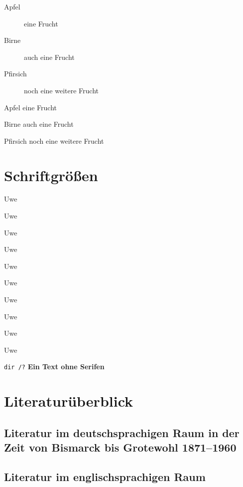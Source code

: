 \documentclass[ngerman,12pt,parskip=half]{scrreprt}
\begin{document}
\begin{description}
\item[Apfel] eine Frucht
\item[Birne] auch eine Frucht
\item[Pfirsich] noch eine weitere Frucht
\end{description}

\begin{compactdesc}
\item[Apfel] eine Frucht
\item[Birne] auch eine Frucht
\item[Pfirsich] noch eine weitere Frucht
\end{compactdesc}

\section{Schriftgrößen}

{\tiny Uwe}

{\scriptsize Uwe} 

{\footnotesize Uwe} 

{\small Uwe} 

{\normalsize Uwe} 

{\large Uwe} 

{\Large Uwe} 

{\LARGE Uwe} 

{\huge Uwe} 

{\Huge Uwe} 

\texttt{dir /?} \textsf{\bfseries Ein Text ohne Serifen}

\section{Literaturüberblick}

\blindtext[15]

\subsection[Literatur im deutschsprachigen Raum]{Literatur im deutschsprachigen Raum in der Zeit von Bismarck bis Grotewohl 1871--1960}

\blindtext[5]

\subsection{Literatur im englischsprachigen Raum}

\blindtext[5]
\end{document}
